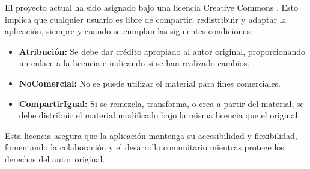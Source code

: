 El proyecto actual ha sido asignado bajo una licencia Creative Commons \cite{cc4}. Esto implica que cualquier usuario es libre de compartir, redistribuir y adaptar la aplicación, siempre y cuando se cumplan las siguientes condiciones:

\begin{itemize}
  \item \textbf{Atribución:} Se debe dar crédito apropiado al autor original, proporcionando un enlace a la licencia e indicando si se han realizado cambios.
  \item \textbf{NoComercial:} No se puede utilizar el material para fines comerciales.
  \item \textbf{CompartirIgual:} Si se remezcla, transforma, o crea a partir del material, se debe distribuir el material modificado bajo la misma licencia que el original.
\end{itemize}

Esta licencia asegura que la aplicación mantenga su accesibilidad y flexibilidad, fomentando la colaboración y el desarrollo comunitario mientras protege los derechos del autor original.
